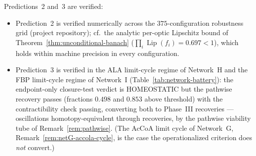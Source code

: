 \documentclass[11pt,a4paper]{article}
\theoremstyle{plain}
\theoremstyle{definition}
\theoremstyle{remark}
\DeclareMathOperator{\Lip}{Lip}
\begin{document}
\noindent Predictions~2 and~3 are verified:

\begin{itemize}[leftmargin=*, itemsep=2pt]
\item Prediction~2 is verified numerically
across the $375$-configuration robustness grid (project repository);
cf.\ the analytic
per-optic Lipschitz bound of Theorem~\ref{thm:unconditional-banach}
($\prod_i \Lip(f_i) = 0.697 < 1$), which holds within machine
precision in every configuration.
\item Prediction~3 is verified in the ALA limit-cycle regime of
Network~H and the FBP limit-cycle regime of Network~I
(Table~\ref{tab:network-battery}): the endpoint-only closure-test
verdict is HOMEOSTATIC but the pathwise recovery passes (fractions
$0.498$ and $0.853$ above threshold) with the contractibility check
passing, converting both to Phase~III recoveries --- oscillations
homotopy-equivalent through recoveries, by the pathwise viability
tube of Remark~\ref{rem:pathwise}. (The AcCoA limit cycle of
Network~G, Remark~\ref{rem:netG-accola-cycle}, is the case the
operationalized criterion does \emph{not} convert.)
\end{itemize}
\end{document}
